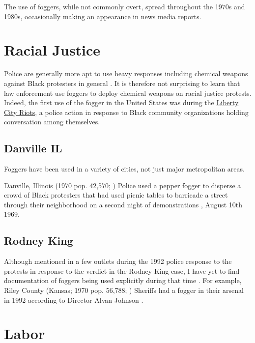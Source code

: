 \documentclass[
  11pt,
  titlepage]{krantz}
\begin{document}
The use of foggers, while not commonly overt, spread throughout the 1970s and 1980s, occasionally making an appearance in news media reports.

\hypertarget{racial-justice}{%
\section*{Racial Justice}\label{racial-justice}}


Police are generally more apt to use heavy responses including chemical weapons against Black protesters in general \citep{DSPDX2020}.
It is therefore not surprising to learn that law enforcement use foggers to deploy chemical weapons on racial justice protests.
Indeed, the first use of the fogger in the United States was during the \protect\hyperlink{MiamiFL1968_08_08}{Liberty City Riots}, a police action in response to Black community organizations holding conversation among themselves.

\hypertarget{danville-il}{%
\subsection*{Danville IL}\label{danville-il}}


Foggers have been used in a variety of cities, not just major metropolitan areas.

Danville, Illinois (1970 pop. 42,570; \citep{USCB1970}) Police used a pepper fogger to disperse a crowd of Black protesters that had used picnic tables to barricade a street through their neighborhood on a second night of demonstrations \citep{Palladium-Item1969}, August 10th 1969.

\hypertarget{rodney-king}{%
\subsection*{Rodney King}\label{rodney-king}}


Although mentioned in a few outlets during the 1992 police response to the protests in response to the verdict in the Rodney King case, I have yet to find documentation of foggers being used explicitly during that time \citep{Askren1992}.
For example, Riley County (Kansas; 1970 pop. 56,788; \citet{USCB1970}) Sheriffs had a fogger in their arsenal in 1992 according to Director Alvan Johnson \citep{Askren1992}.

\hypertarget{labor}{%
\section*{Labor}\label{labor}}
\end{document}
